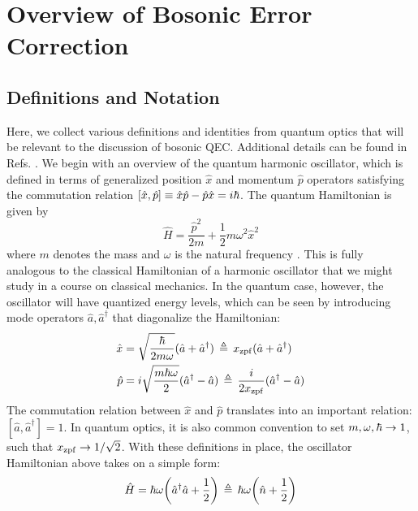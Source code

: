 \section{Overview of Bosonic Error Correction}
\subsection{Definitions and Notation \label{sec:2_BosonicQEC_Definitions}}
Here, we collect various definitions and identities from quantum optics that will be relevant to the discussion of bosonic QEC. Additional details can be found in Refs. \cite{shankar1994principles, raimond2006exploring, grynberg2010introduction}. We begin with an overview of the quantum harmonic oscillator, which is defined in terms of generalized position $\hat{x}$ and momentum $\hat{p}$ operators satisfying the commutation relation $[\hat{x}, \hat{p}] \equiv \hat{x}\hat{p} - \hat{p}\hat{x} = i\hbar$. The quantum Hamiltonian is given by
\begin{equation}
    \hat{H} = \frac{\hat{p}^2}{2m} + \frac{1}{2}m\omega^2 \hat{x}^2
\end{equation}
where $m$ denotes the mass and $\omega$ is the natural frequency \cite{shankar1994principles}. This is fully analogous to the classical Hamiltonian of a harmonic oscillator that we might study in a course on classical mechanics. In the quantum case, however, the oscillator will have quantized energy levels, which can be seen by introducing mode operators $\hat{a}, \hat{a}^\dagger$ that diagonalize the Hamiltonian:
\begin{align}
\begin{split}
     \hat{x} &= \sqrt{\frac{\hbar}{2m\omega}}(\hat{a} + \hat{a}^\dagger) \,\triangleq\, x_{\rm zpf} (\hat{a} + \hat{a}^\dagger) \\
     \hat{p} &= i\sqrt{\frac{m\hbar\omega}{2}}(\hat{a}^\dagger - \hat{a}) \,\triangleq\, \frac{i}{2x_{\rm zpf}} (\hat{a}^\dagger - \hat{a})
\end{split}
\end{align}
The commutation relation between $\hat{x}$ and $\hat{p}$ translates into an important relation: $[\hat{a}, \hat{a}^\dagger] = 1$. In quantum optics, it is also common convention to set $m, \omega, \hbar \to 1$, such that $x_{\rm zpf} \to 1/\sqrt{2}$. With these definitions in place, the oscillator Hamiltonian above takes on a simple form:
\begin{equation}
    \hat{H} = \hbar\omega\bigg(\hat{a}^\dagger\hat{a} + \frac{1}{2}\bigg) \,\triangleq\, \hbar\omega\bigg(\hat{n} + \frac{1}{2}\bigg)
\end{equation}
